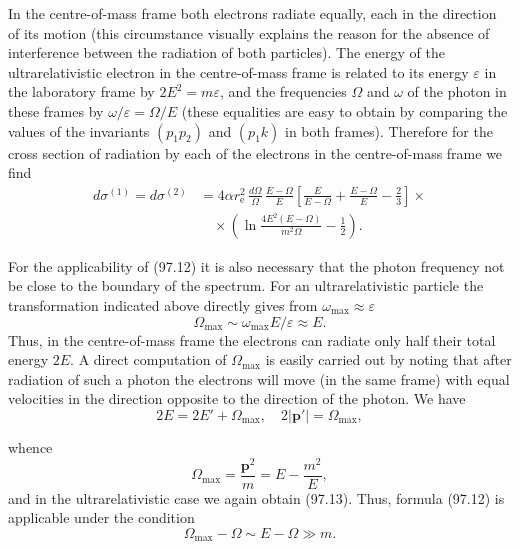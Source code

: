 In the centre-of-mass frame both electrons radiate equally, each in the direction of its motion (this circumstance visually explains the reason for the absence of interference between the radiation of both particles). The energy of the ultrarelativistic electron in the centre-of-mass frame is related to its energy $\varepsilon$ in the laboratory frame by $2E^2 = m\varepsilon$, and the frequencies $\Omega$ and $\omega$ of the photon in these frames by $\omega/\varepsilon = \Omega/E$ (these equalities are easy to obtain by comparing the values of the invariants $(p_1 p_2)$ and $(p_1 k)$ in both frames). Therefore for the cross section of radiation by each of the electrons in the centre-of-mass frame we find
\begin{equation}
\begin{split}
d\sigma^{(1)} = d\sigma^{(2)} &= 4\alpha r_\mathrm{e}^2\,\frac{d\Omega}{\Omega}\,\frac{E-\Omega}{E}\!\left[\frac{E}{E-\Omega} + \frac{E-\Omega}{E} - \frac{2}{3}\right] \times {} \\
&\quad \times \left(\ln\frac{4E^2(E-\Omega)}{m^2\Omega} - \frac{1}{2}\right).
\end{split}
\label{eq:97.12}
\end{equation}

For the applicability of (97.12) it is also necessary that the photon frequency not be close to the boundary of the spectrum. For an ultrarelativistic particle the transformation indicated above directly gives from $\omega_\text{max} \approx \varepsilon$
\begin{equation}
\Omega_\text{max} \sim \omega_\text{max} E/\varepsilon \approx E.
\label{eq:97.13}
\end{equation}
Thus, in the centre-of-mass frame the electrons can radiate only half their total energy $2E$. A direct computation of $\Omega_\text{max}$ is easily carried out by noting that after radiation of such a photon the electrons will move (in the same frame) with equal velocities in the direction opposite to the direction of the photon. We have
\[
2E = 2E' + \Omega_\text{max}, \quad 2|\mathbf{p}'| = \Omega_\text{max},
\]


whence
\begin{equation}
\Omega_\text{max} = \frac{\mathbf{p}^2}{m} = E - \frac{m^2}{E},
\label{eq:97.14}
\end{equation}
and in the ultrarelativistic case we again obtain (97.13). Thus, formula (97.12) is applicable under the condition
\begin{equation}
\Omega_\text{max} - \Omega \sim E - \Omega \gg m.
\label{eq:97.15}
\end{equation}

